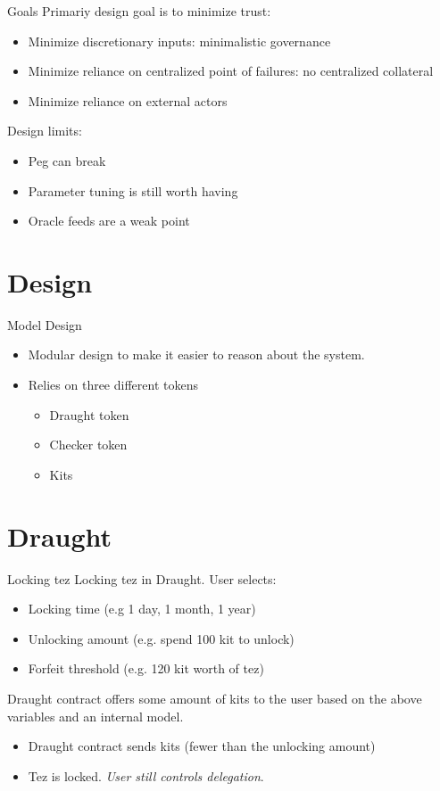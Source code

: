 \documentclass[handout]{beamer}
\newcommand{\yel}[
  1]{{\color{yellow} #1}}
\begin{document}
\begin{frame}{Goals}
  Primariy design goal is to \yel{minimize trust}:
  \begin{itemize}
  \item Minimize discretionary inputs: minimalistic governance
  \item Minimize reliance on centralized point of failures: no centralized collateral
  \item Minimize reliance on external actors
  \end{itemize}
  Design \yel{limits}:
  \begin{itemize}
  \item Peg can break
  \item Parameter tuning is still worth having
  \item Oracle feeds are a weak point
  \end{itemize}
\end{frame}

\section{Design}

\begin{frame}{Model Design}
  \begin{itemize}
  \item \yel{Modular} design to make it easier to reason about the system.
  \item Relies on three different tokens
    \begin{itemize}
    \item Draught token
    \item Checker token
    \item \yel{Kits}
    \end{itemize}    
  \end{itemize}
  \end{frame}

\section{Draught}

\begin{frame}{Locking tez}
  Locking tez in Draught. User selects:
  \begin{itemize}
  \item Locking \yel{time} (e.g 1 day, 1 month, 1 year)
  \item Unlocking \yel{amount} (e.g. spend 100 kit to unlock)
  \item Forfeit \yel{threshold} (e.g. 120 kit worth of tez)
  \end{itemize}
  Draught contract offers some amount of kits to the user
  based on the above variables and an internal \yel{model}.
  \begin{itemize}
  \item Draught contract sends kits (fewer than the unlocking amount)
  \item Tez is locked. \emph{User still controls delegation}.
  \end{itemize}
\end{frame}
\end{document}
